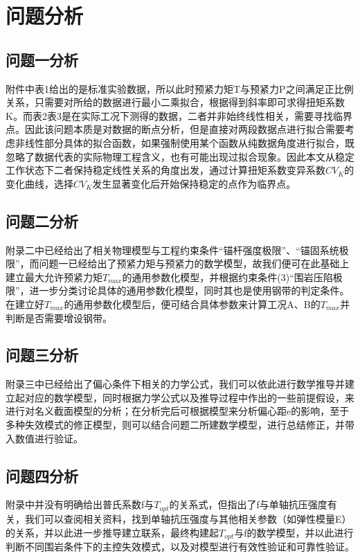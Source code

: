 \documentclass[UTF-8,a4paper,zihao=-4]{ctexart}
\begin{document}
\section{问题分析}
\subsection{问题一分析}
附件中表1给出的是标准实验数据，所以此时预紧力矩T与预紧力P之间满足正比例关系，只需要对所给的数据进行最小二乘拟合，根据得到斜率即可求得扭矩系数K。而表2表3是在实际工况下测得的数据，二者并非始终线性相关，需要寻找临界点。因此该问题本质是对数据的断点分析，但是直接对两段数据点进行拟合需要考虑非线性部分具体的拟合函数，如果强制使用某个函数从纯数据角度进行拟合，既忽略了数据代表的实际物理工程含义，也有可能出现过拟合现象。因此本文从稳定工作状态下二者保持稳定线性关系的角度出发，通过计算扭矩系数变异系数$CV_K$的变化曲线，选择$CV_K$发生显著变化后开始保持稳定的点作为临界点。

\subsection{问题二分析}
附录二中已经给出了相关物理模型与工程约束条件“锚杆强度极限”、“锚固系统极限”，而问题一已经给出了预紧力矩与预紧力的数学模型，故我们便可在此基础上建立最大允许预紧力矩$T_{max}$的通用参数化模型，并根据约束条件(3)“围岩压陷极限”，进一步分类讨论具体的通用参数化模型，同时其也是使用钢带的判定条件。在建立好$T_{max}$的通用参数化模型后，便可结合具体参数来计算工况A、B的$T_{max}$并判断是否需要增设钢带。

\subsection{问题三分析}
附录三中已经给出了偏心条件下相关的力学公式，我们可以依此进行数学推导并建立起对应的数学模型，同时根据力学公式以及推导过程中作出的一些前提假设，来进行对名义截面模型的分析；在分析完后可根据模型来分析偏心距e的影响，至于多种失效模式的修正模型，则可以结合问题二所建数学模型，进行总结修正，并带入数值进行验证。

\subsection{问题四分析}
附录中并没有明确给出普氏系数f与$T_{opt}$的关系式，但指出了f与单轴抗压强度有关，我们可以查阅相关资料，找到单轴抗压强度与其他相关参数（如弹性模量E）的关系，并以此进一步推导建立联系，最终构建起$T_{opt}$与f的数学模型，并以此进行判断不同围岩条件下的主控失效模式，以及对模型进行有效性验证和可靠性验证。
\end{document}

